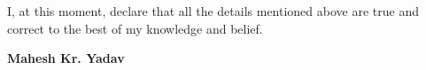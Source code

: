 
\begin{cvparagraph}

I, at this moment, declare that all the details mentioned above are true and correct to the best of my knowledge
and belief.
   
\hfill \textbf{Mahesh Kr. Yadav}
\end{cvparagraph}
